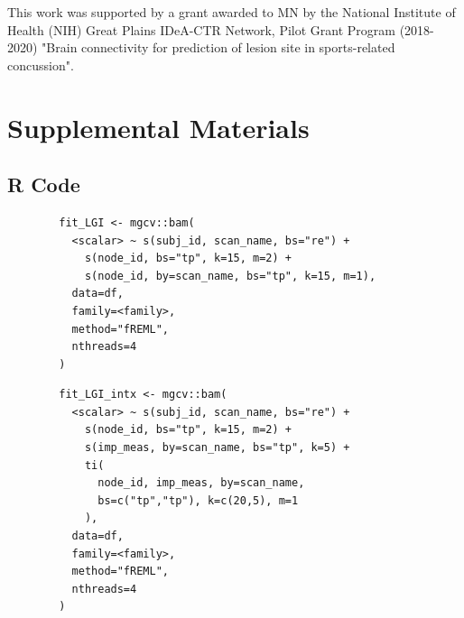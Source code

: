 \documentclass[12pt]{article}
\newcommand{\beginsupplement}{%
	\setcounter{table}{0}
	\renewcommand{\thetable}{S\arabic{table}}%
	\setcounter{figure}{0}
	\renewcommand{\thefigure}{S\arabic{figure}}%
}
\begin{document}
This work was supported by a grant awarded to MN by the National Institute of Health (NIH) Great Plains IDeA-CTR Network, Pilot Grant Program (2018-2020) "Brain connectivity for prediction of lesion site in sports-related concussion".


\pagebreak
\printbibliography
\pagebreak


\section{Supplemental Materials}
\label{sec:supp-materials}
\beginsupplement

\subsection{R Code}
\label{ssec:supp-rcode}

\begin{equ}[H]
	\begin{lstlisting}
		fit_LGI <- mgcv::bam(
		  <scalar> ~ s(subj_id, scan_name, bs="re") +
		    s(node_id, bs="tp", k=15, m=2) +
		    s(node_id, by=scan_name, bs="tp", k=15, m=1),
		  data=df,
		  family=<family>,
		  method="fREML",
		  nthreads=4
		)
	\end{lstlisting}
	\caption{Tract scalars are modeled as a function of tract node with thin-plate regression splines using both global and group (\lstinline{scan_name}) smooths as well as individual group wiggliness. \lstinline{<scalar>} = relevant DWI metric (AD, RD, MD, or FA), \lstinline{scan_name} = visit identifier factor (Base, Post, RTP), \lstinline{<family>} = relevant family and link function for scalar distribution.}
	\label{supp-code:gam-lgi}
\end{equ}


\begin{equ}[H]
	\begin{lstlisting}
		fit_LGI_intx <- mgcv::bam(
		  <scalar> ~ s(subj_id, scan_name, bs="re") +
		    s(node_id, bs="tp", k=15, m=2) +
		    s(imp_meas, by=scan_name, bs="tp", k=5) +
		    ti(
		      node_id, imp_meas, by=scan_name,
		      bs=c("tp","tp"), k=c(20,5), m=1
		    ),
		  data=df,
		  family=<family>,
		  method="fREML",
		  nthreads=4
		)
	\end{lstlisting}
	\caption{Tract scalars are modeled as a function of separate 1D node and ImPACT smooths as well as a 2D tensor product interaction surface. \lstinline{imp_meas} = ImPACT composite or total symptom measure.}
	\label{supp-code:gam-lgi-intx}
\end{equ}
\end{document}
